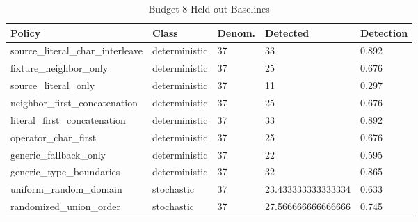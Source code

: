 \begin{table}[t]
\centering
\small
\begin{tabular}{lllll}
\toprule
Policy & Class & Denom. & Detected & Detection \\
\midrule
source\_literal\_char\_interleave & deterministic & 37 & 33 & 0.892 \\
fixture\_neighbor\_only & deterministic & 37 & 25 & 0.676 \\
source\_literal\_only & deterministic & 37 & 11 & 0.297 \\
neighbor\_first\_concatenation & deterministic & 37 & 25 & 0.676 \\
literal\_first\_concatenation & deterministic & 37 & 33 & 0.892 \\
operator\_char\_first & deterministic & 37 & 25 & 0.676 \\
generic\_fallback\_only & deterministic & 37 & 22 & 0.595 \\
generic\_type\_boundaries & deterministic & 37 & 32 & 0.865 \\
uniform\_random\_domain & stochastic & 37 & 23.433333333333334 & 0.633 \\
randomized\_union\_order & stochastic & 37 & 27.566666666666666 & 0.745 \\
\bottomrule
\end{tabular}
\caption{Budget-8 Held-out Baselines}
\end{table}
